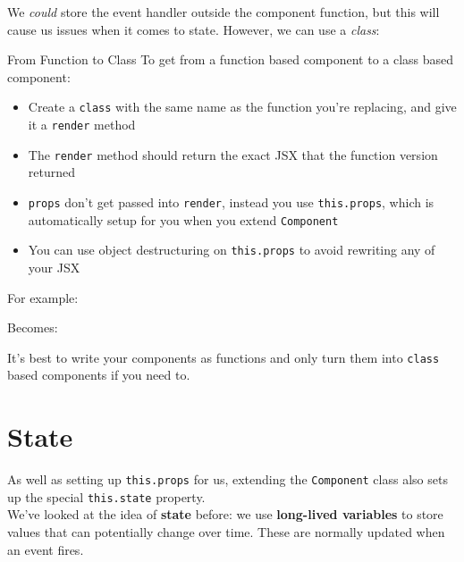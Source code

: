 We \textit{could} store the event handler outside the component function, but this will cause us issues when it comes to state. However, we can use a \textit{class}:



\begin{infobox}{From Function to Class}
    To get from a function based component to a class based component:

    \begin{itemize}
        \item Create a \texttt{class} with the same name as the function you're replacing, and give it a \texttt{render} method
        \item The \texttt{render} method should return the exact JSX that the function version returned
        \item \texttt{props} don't get passed into \texttt{render}, instead you use \texttt{this.props}, which is automatically setup for you when you extend \texttt{Component}
        \item You can use object destructuring on \texttt{this.props} to avoid rewriting any of your JSX
    \end{itemize}

    For example:


    Becomes:


    It's best to write your components as functions and only turn them into \texttt{class} based components if you need to.
\end{infobox}


\pagebreak


\section{State}

As well as setting up \texttt{this.props} for us, extending the \texttt{Component} class also sets up the special \texttt{this.state} property.
\\

We've looked at the idea of \textbf{state} before: we use \textbf{long-lived variables} to store values that can potentially change over time. These are normally updated when an event fires.
\\

